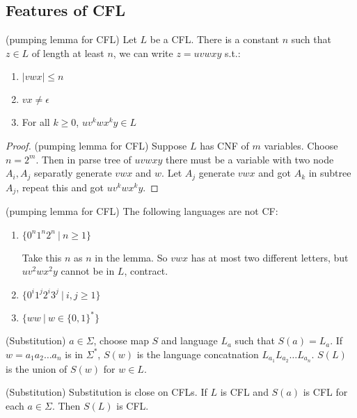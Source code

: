     \subsection{Features of CFL}
    \begin{lemma}
        (pumping lemma for CFL) Let $L$ be a CFL. There is a constant $n$ such that $z\in L$ of length at least $n$, we can write $z=uvwxy$ s.t.:
        \begin{enumerate}
            \item $|vwx|\le n$
            \item $vx\ne \epsilon$
            \item For all $k\ge 0$, $uv^{k}wx^{k}y\in L$
        \end{enumerate}
    \end{lemma}
    \begin{proof}
        (pumping lemma for CFL) Suppose $L$ has CNF of $m$ variables. Choose $n=2^{m}$. Then in parse tree of $uvwxy$ there must be a variable with two node $A_{i},A_{j}$ separatly generate $vwx$ and $w$. Let $A_{j}$ generate $vwx$ and got $A_{k}$ in subtree $A_{j}$, repeat this and got $uv^{k}wx^{k}y$.
    \end{proof}
    \begin{example}
        (pumping lemma for CFL) The following languages are not CF:
        \begin{enumerate}
            \item $\{0^{n}1^{n}2^{n}\ |\ n\ge 1\}$ 

                Take this $n$ as $n$ in the lemma. So $vwx$ has at most two different letters, but $uv^{2}wx^{2}y$ cannot be in $L$, contract.
            \item $\{0^{i}1^{j}2^{i}3^{j}\ |\ i,j\ge 1\}$
            \item $\{ww\ |\ w\in \{0,1\}^{*}\}$
        \end{enumerate}
    \end{example}
    \begin{definition}
        (Substitution) $a\in \Sigma$, choose map $S$ and language $L_{a}$ such that $S\left( a \right) =L_{a}$. If $w=a_1a_2\ldots a_{n}$ is in $\Sigma^{*}$, $S\left( w \right) $ is the language concatnation $L_{a_1}L_{a_2}\ldots L_{a_{n}}$. $S\left( L \right) $ is the union of $S\left( w \right) $ for $w\in L$.
    \end{definition}
    \begin{theorem}
        (Substitution) Substitution is close on CFLs. If $L$ is CFL and $S\left( a \right) $ is CFL for each $a\in \Sigma$. Then $S\left( L \right) $ is CFL.
    \end{theorem}
